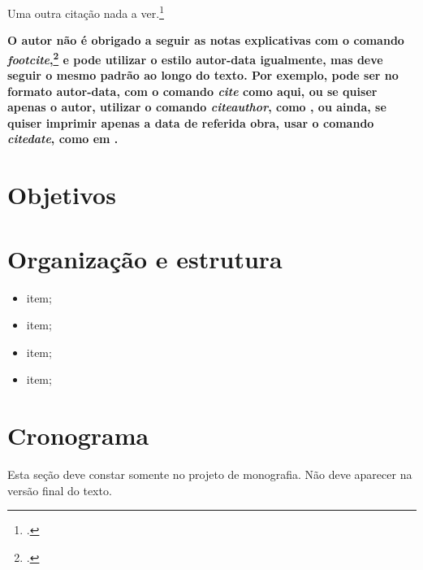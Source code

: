 Uma outra citação nada a ver.\footcite[E como sabermos, Herão é um dos pioneiros das máquinas a vapor. Sua invenção, nem por isso, provocou uma revoluçaõ industrial no primeiro século. Cf.][12]{herao}

\textbf{O autor não é obrigado a seguir as notas explicativas com o comando \textit{footcite},\footcite[Por exemplo, como este, em][]{boyle1772} e pode utilizar o estilo autor-data igualmente, mas deve seguir o mesmo padrão ao longo do texto. Por exemplo, pode ser no formato autor-data, com o comando \textit{cite} como aqui, \cite{descartes-oeuvres-volx} ou se quiser apenas o autor, utilizar o comando \textit{citeauthor}, como \citeauthor{descartes-oeuvres-volx}, ou ainda, se quiser imprimir apenas a data de referida obra, usar o comando \textit{citedate}, como em .}

\lipsum[1]

\section{Objetivos}

\lipsum[7]

\lipsum[8]

\section{Organiza{\c c}{\~a}o e estrutura}

\lipsum*[9-11]

\begin{itemize}
\item item;
\item item;
\item item;
\item item;
\end{itemize}

\section{Cronograma}

Esta seção deve constar somente no projeto de monografia. Não deve aparecer na versão final do texto.



